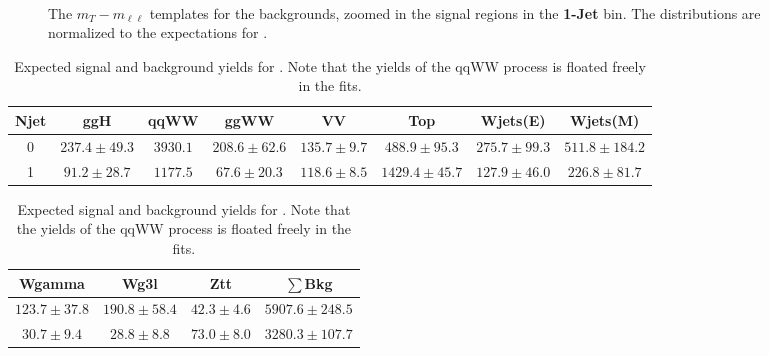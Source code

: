 \begin{figure}[!hbtp]
{}
\\
\caption{The $m_T-m_{\ell\ell}$ templates for the backgrounds, zoomed in 
the signal regions in the {\bf 1-Jet} bin. The distributions are 
normalized to the expectations for \intlumiEightTeV.}
\label{fig:mtvsmll_bkg_1j}
\end{figure}


\begin{table}[!hbtp]
{%
 \begin{center}

 \begin{tabular}{|c | c | c c c c c c  }
 \hline
Njet & ggH & qqWW & ggWW & VV & Top & Wjets(E) & Wjets(M) \\ \hline
0    & $237.4\pm49.3$ & $3930.1$ & $208.6\pm62.6$ & $135.7\pm9.7$ & $488.9\pm95.3$  & $275.7\pm99.3$ & $511.8\pm184.2$\\
1    & $91.2\pm28.7$  & $1177.5$ & $67.6\pm 20.3$ & $118.6\pm8.5$ & $1429.4\pm45.7$ & $127.9\pm46.0$ & $226.8\pm81.7$ \\
\hline
\end{tabular}

\vspace{10pt}

 \begin{tabular}{  c c c | c |}
 \hline
  Wgamma & Wg3l & Ztt & $\sum$Bkg \\ \hline
 $123.7\pm37.8$ & $190.8\pm58.4$ & $42.3\pm4.6$ & $5907.6\pm248.5$ \\ 
 $30.7\pm9.4$   & $28.8\pm8.8$   & $73.0\pm8.0$ & $3280.3\pm107.7$ \\
\hline
\end{tabular}
\end{center}
}
\caption{Expected signal and background yields for \intlumiEightTeV. Note that the 
yields of the qqWW process is floated freely in the fits. }
\label{tab:yield}
\end{table}
